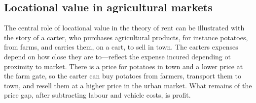  







\subsection{Locational value in agricultural markets}

The central role of locational value in the theory of \gls{rent} can be illustrated with the story of a carter, who purchases agricultural products, for instance potatoes, from farms, and carries them, on a cart, to sell in town. 
The carters expenses depend on how close they are to---reflect the expense incured depending ot proximity to market. 
There is a price for potatoes in town and a lower price at the farm gate, so the carter can buy potatoes from farmers, transport them to town, and resell them at a higher price in the urban market. What remains of the price gap, after subtracting labour and vehicle costs, is profit.  

